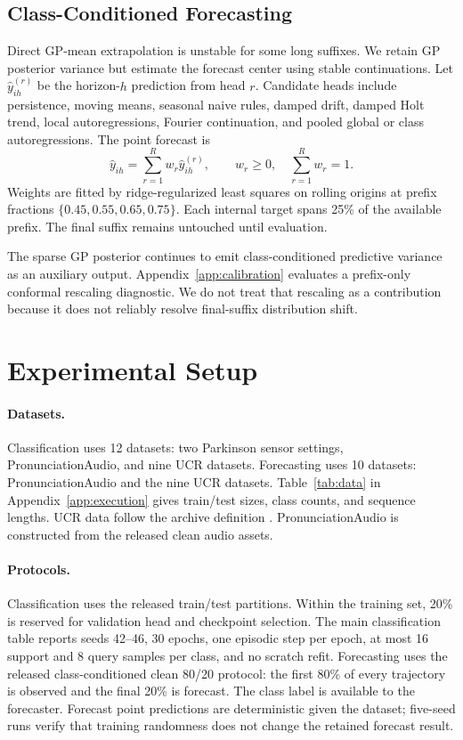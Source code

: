 \documentclass[11pt]{article}
\begin{document}
\subsection{Class-Conditioned Forecasting}

Direct GP-mean extrapolation is unstable for some long suffixes. We retain GP posterior variance but estimate the forecast center using stable continuations. Let $\widehat{y}_{ih}^{(r)}$ be the horizon-$h$ prediction from head $r$. Candidate heads include persistence, moving means, seasonal naive rules, damped drift, damped Holt trend, local autoregressions, Fourier continuation, and pooled global or class autoregressions. The point forecast is
\begin{equation}
  \widehat{y}_{ih} = \sum_{r=1}^{R} w_r\widehat{y}_{ih}^{(r)},
  \qquad w_r\geq 0,\quad \sum_{r=1}^{R}w_r=1.
  \label{eq:blend}
\end{equation}
Weights are fitted by ridge-regularized least squares on rolling origins at prefix fractions $\{0.45,0.55,0.65,0.75\}$. Each internal target spans 25\% of the available prefix. The final suffix remains untouched until evaluation.

The sparse GP posterior continues to emit class-conditioned predictive variance as an auxiliary output. Appendix~\ref{app:calibration} evaluates a prefix-only conformal rescaling diagnostic. We do not treat that rescaling as a contribution because it does not reliably resolve final-suffix distribution shift.

\section{Experimental Setup}

\paragraph{Datasets.}
Classification uses 12 datasets: two Parkinson sensor settings, PronunciationAudio, and nine UCR datasets. Forecasting uses 10 datasets: PronunciationAudio and the nine UCR datasets. Table~\ref{tab:data} in Appendix~\ref{app:execution} gives train/test sizes, class counts, and sequence lengths. UCR data follow the archive definition \citep{dau2019ucr}. PronunciationAudio is constructed from the released clean audio assets.

\paragraph{Protocols.}
Classification uses the released train/test partitions. Within the training set, 20\% is reserved for validation head and checkpoint selection. The main classification table reports seeds 42--46, 30 epochs, one episodic step per epoch, at most 16 support and 8 query samples per class, and no scratch refit. Forecasting uses the released class-conditioned clean 80/20 protocol: the first 80\% of every trajectory is observed and the final 20\% is forecast. The class label is available to the forecaster. Forecast point predictions are deterministic given the dataset; five-seed runs verify that training randomness does not change the retained forecast result.
\end{document}
